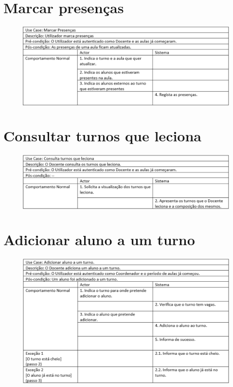 \documentclass[12pt,a4paper]{report}
\begin{document}
\begin{appendices}
\section{Marcar presenças}
\begin{figure}[H]
	\centering 
	\includegraphics[width=\textwidth]{modelacao/especificacao_use_case/MarcarPresencas.png}  
\end{figure}

\section{Consultar turnos que leciona}
\begin{figure}[H]
	\centering 
	\includegraphics[width=\textwidth]{modelacao/especificacao_use_case/ConsultarTurnosLeciona.png}  
\end{figure}

\section{Adicionar aluno a um turno}
\begin{figure}[H]
	\centering 
	\includegraphics[width=\textwidth]{modelacao/especificacao_use_case/adicionaaluno.png}  
\end{figure}


\end{appendices}
\end{document}
